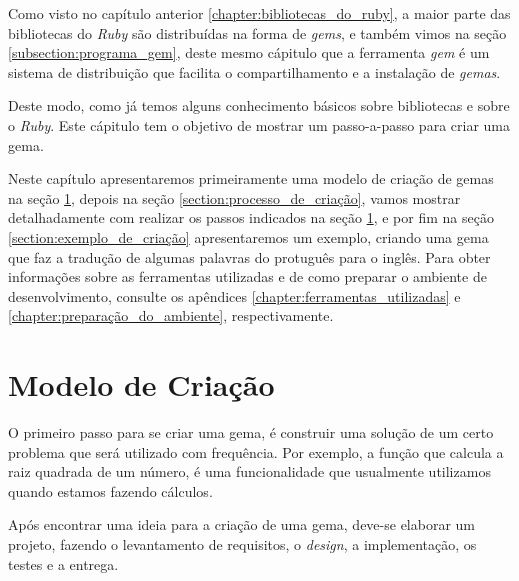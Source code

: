 Como visto no capítulo anterior \ref{chapter:bibliotecas_do_ruby}, a maior parte das bibliotecas do
\emph{Ruby} são distribuídas na forma de \emph{gems}, e também vimos na seção
\ref{subsection:programa_gem}, deste mesmo cápitulo que a ferramenta \emph{gem} é um sistema de distribuição
que facilita o compartilhamento e a instalação de \emph{gemas}.

Deste modo, como já temos alguns conhecimento básicos sobre bibliotecas e sobre o \emph{Ruby}. Este cápitulo
tem o objetivo de mostrar um passo-a-passo para criar uma gema.


Neste capítulo apresentaremos primeiramente uma modelo de criação de gemas na seção \ref{section:modelo_de_criação},
depois na seção \ref{section:processo_de_criação}, vamos mostrar detalhadamente com realizar os passos indicados
na seção \ref{section:modelo_de_criação}, e por fim na seção \ref{section:exemplo_de_criação} apresentaremos um
exemplo, criando uma gema que faz a tradução de algumas palavras do protuguês para o inglês. Para obter informações
sobre as ferramentas utilizadas e de como preparar o ambiente de desenvolvimento, consulte os apêndices
\ref{chapter:ferramentas_utilizadas} e \ref{chapter:preparação_do_ambiente}, respectivamente.


\section{Modelo de Criação}
\label{section:modelo_de_criação}




O primeiro passo para se criar uma gema, é construir uma solução de um certo problema que será utilizado
com frequência. Por exemplo, a função que calcula a raiz quadrada de um número, é uma funcionalidade que
usualmente utilizamos quando estamos fazendo cálculos.

Após encontrar uma ideia para a criação de uma gema, deve-se elaborar um projeto, fazendo o levantamento
de requisitos, o \emph{design}, a implementação, os testes e a entrega.

